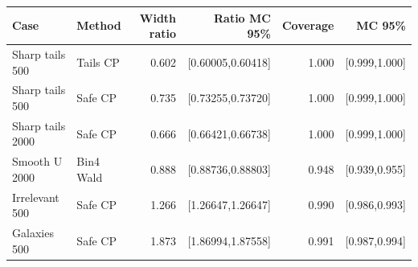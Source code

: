 \begin{tabular}{llrrrr}
\toprule Case & Method & Width ratio & Ratio MC 95\% & Coverage & MC 95\% \\\midrule
Sharp tails 500 & Tails CP & 0.602 & [0.60005,0.60418] & 1.000 & [0.999,1.000] \\
Sharp tails 500 & Safe CP & 0.735 & [0.73255,0.73720] & 1.000 & [0.999,1.000] \\
Sharp tails 2000 & Safe CP & 0.666 & [0.66421,0.66738] & 1.000 & [0.999,1.000] \\
Smooth U 2000 & Bin4 Wald & 0.888 & [0.88736,0.88803] & 0.948 & [0.939,0.955] \\
Irrelevant 500 & Safe CP & 1.266 & [1.26647,1.26647] & 0.990 & [0.986,0.993] \\
Galaxies 500 & Safe CP & 1.873 & [1.86994,1.87558] & 0.991 & [0.987,0.994] \\
\bottomrule\end{tabular}